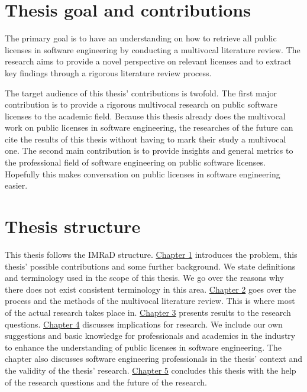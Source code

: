 \section{Thesis goal and contributions}
The primary goal is to have an understanding on how to retrieve all public licenses in software engineering by conducting a multivocal literature review. The research aims to provide a novel perspective on relevant licenses and to extract key findings through a rigorous literature review process.

The target audience of this thesis' contributions is twofold. The first major contribution is to provide a rigorous multivocal research on public software licenses to the academic field. Because this thesis already does the multivocal work on public licenses in software engineering, the researches of the future can cite the results of this thesis without having to mark their study a multivocal one. The second main contribution is to provide insights and general metrics to the professional field of software engineering on public software licenses. Hopefully this makes conversation on public licenses in software engineering easier.

\section{Thesis structure}
This thesis follows the IMRaD structure. \hyperref[intro]{Chapter 1} introduces the problem, this thesis' possible contributions and some further background. We state definitions and terminology used in the scope of this thesis. We go over the reasons why there does not exist consistent terminology in this area. \hyperref[methods]{Chapter 2} goes over the process and the methods of the multivocal literature review. This is where most of the actual research takes place in. \hyperref[results]{Chapter 3} presents results to the research questions. \hyperref[discussion]{Chapter 4} discusses implications for research. We include our own suggestions and basic knowledge for professionals and academics in the industry to enhance the understanding of public licenses in software engineering. The chapter also discusses software engineering professionals in the thesis' context and the validity of the thesis' research. \hyperref[conclusions]{Chapter 5} concludes this thesis with the help of the research questions and the future of the research.